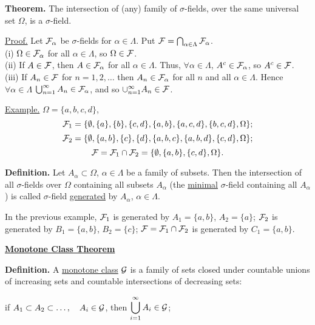 \documentclass[a4paper,10pt]{article}
\newcommand{\1}[1]{\mathbf{1}_{\{#1\}}}
\begin{document}
{\bf Theorem.} The intersection of (any) family of $\sigma$-fields, over the same universal set $\Omega$, is a $\sigma$-field.

\underline{Proof.} Let ${\cal F}_\alpha$ be $\sigma$-fields for $\alpha\in\Lambda$. Put ${\cal F}=\bigcap_{\alpha\in\Lambda}{\cal F}_\alpha$.\\
(i) $\Omega\in{\cal F}_\alpha$ for all $\alpha\in\Lambda$, so $\Omega\in{\cal F}$.\\
(ii) If $A\in{\cal F}$, then $A\in{\cal F}_\alpha$ for all $\alpha\in\Lambda$. Thus, $\forall\alpha\in\Lambda$, $A^c\in{\cal F}_\alpha$, so $A^c\in{\cal F}$.\\
(iii) If $A_n\in{\cal F}$ for $n=1,2,\ldots$ then $A_n\in{\cal F}_\alpha$ for all $n$ and all $\alpha\in\Lambda$. Hence $\forall\alpha\in\Lambda$ $\bigcup_{n=1}^\infty A_n\in{\cal F}_\alpha$, and so $\cup_{n=1}^\infty A_n\in{\cal F}$. \blacksquare\vspace{3mm}

\underline{Example.} $\Omega=\{a,b,c,d\}$,
  $${\cal F}_1=\{\emptyset, \{a\},\{b\},\{c,d\},\{a,b\},\{a,c,d\},\{b,c,d\},\Omega\};$$
  $${\cal F}_2=\{\emptyset,\{a,b\},\{c\},\{d\},\{a,b,c\},\{a,b,d\},\{c,d\},\Omega\};$$
  $${\cal F}={\cal F}_1\cap{\cal F}_2=\{\emptyset,\{a,b\},\{c,d\},\Omega\}.$$\vspace{3mm}

{\bf Definition.} Let $A_\alpha\subset\Omega$, $\alpha\in\Lambda$ be a family of subsets. Then the intersection of all $\sigma$-fields over $\Omega$ containing all subsets $A_\alpha$ (the \underline{minimal} $\sigma$-field containing all $A_\alpha$) is called $\sigma$-field \underline{generated} by $A_\alpha$, $\alpha\in\Lambda$.\vspace{3mm}

In the previous example, ${\cal F}_1$ is generated by $A_1=\{a,b\}$, $A_2=\{a\}$; ${\cal F}_2$ is generated by $B_1=\{a,b\}$, $B_2=\{c\}$; ${\cal F}={\cal F}_1\cap {\cal F}_2$ is generated by $C_1=\{a,b\}$.\vspace{3mm}

\begin{center}\bf\underline{Monotone Class Theorem} \end{center}

{\bf Definition.} A \underline{monotone class} $\cal G$ is a family of sets closed under countable unions of increasing sets and countable intersections of decreasing sets:

if $A_1\subset A_2\subset\ldots,~~~A_i\in{\cal G}$,  then  $\displaystyle\bigcup_{i=1}^\infty A_i\in{\cal G}$;
\end{document}
